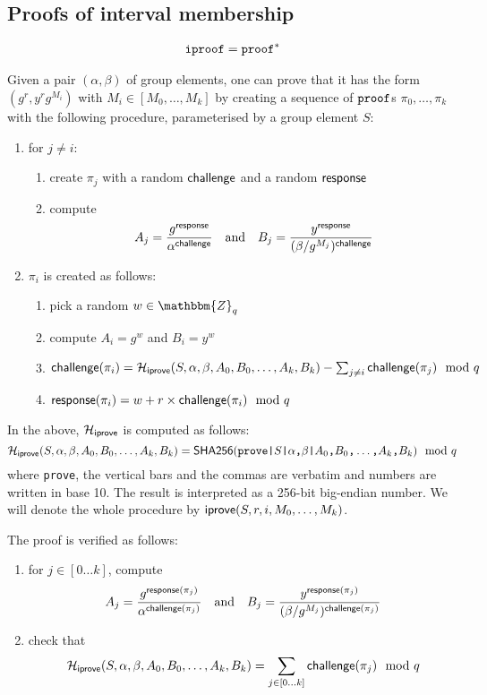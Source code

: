 \documentclass[a4paper]{article}
\newcommand{\Z}{\mathbbm{Z}}
\newcommand{\shatwo}{\textsf{SHA256}}
\begin{document}
\subsection{Proofs of interval membership}
\label{iproof}

\begin{gather*}
  \texttt{iproof}=\texttt{proof}^\ast
\end{gather*}

Given a pair $(\alpha,\beta)$ of group elements, one can prove that it
has the form $(g^r,y^rg^{M_i})$ with $M_i\in[M_0,\dots,M_k]$ by
creating a sequence of $\texttt{proof}$s $\pi_0,\dots,\pi_k$ with the
following procedure, parameterised by a group element $S$:
\begin{enumerate}
\item for $j\neq i$:
  \begin{enumerate}
  \item create $\pi_j$ with a random $\textsf{challenge}$ and a random
    $\textsf{response}$
  \item compute
    \[A_j=\frac{g^{\textsf{response}}}{\alpha^{\textsf{challenge}}}\quad\text{and}\quad
    B_j=\frac{y^{\textsf{response}}}{(\beta/g^{M_j})^{\textsf{challenge}}}\]
  \end{enumerate}
\item $\pi_i$ is created as follows:
  \begin{enumerate}
  \item pick a random $w\in\Z_q$
  \item compute $A_i=g^w$ and $B_i=y^w$
  \item $\textsf{challenge}(\pi_i)=\mathcal{H}_{\textsf{iprove}}(S,\alpha,\beta,A_0,B_0,\dots,A_k,B_k)-\sum_{j\neq
      i}\textsf{challenge}(\pi_j)\mod q$
  \item $\textsf{response}(\pi_i)=w+r\times\textsf{challenge}(\pi_i)\mod q$
  \end{enumerate}
\end{enumerate}
In the above, $\mathcal{H}_{\textsf{iprove}}$ is computed as follows:
\[\Hash_\iprove(S,\alpha,\beta,A_0,B_0,\dots,A_k,B_k)=\shatwo(\verb=prove|=S\verb=|=\alpha\verb=,=\beta\verb=|=A_0\verb=,=B_0\verb=,=\dots\verb=,=A_k\verb=,=B_k)\mod q\]
where \verb=prove=, the vertical bars and the commas are verbatim and
numbers are written in base 10. The result is interpreted as a 256-bit
big-endian number. We will denote the whole procedure by
$\textsf{iprove}(S,r,i,M_0,\dots,M_k)$.

The proof is verified as follows:
\begin{enumerate}
\item for $j\in[0\dots k]$, compute
  \[A_j=\frac{g^{\textsf{response}(\pi_j)}}{\alpha^{\textsf{challenge}(\pi_j)}}\quad\text{and}\quad
  B_j=\frac{y^{\textsf{response}(\pi_j)}}{(\beta/g^{M_j})^{\textsf{challenge}(\pi_j)}}\]
\item check that
  \[\mathcal{H}_{\textsf{iprove}}(S,\alpha,\beta,A_0,B_0,\dots,A_k,B_k)=\sum_{j\in[0\dots
    k]}\textsf{challenge}(\pi_j)\mod q\]
\end{enumerate}
\end{document}
